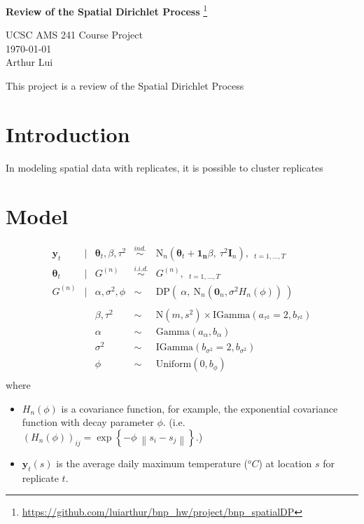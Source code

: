 \documentclass{article}
\def\wl{\par \vspace{\baselineskip}\noindent}
\def\hline{ \textcolor{lgrey}{\hrulefill} }
\newcommand{\m}[1]{\mathbf{\bm{#1}}} %
\def\norm#1{\left\lVert#1\right\rVert}
\begin{document}
\begin{center}
  {\huge \textbf{Review of the Spatial Dirichlet Process}
    \footnote{\url{https://github.com/luiarthur/bnp_hw/project/bnp_spatialDP}}
  }\\
  \wl
  UCSC AMS 241 Course Project\\
  \noindent\today\\
  Arthur Lui\\
  \hline
\end{center}

This project is a review of the Spatial Dirichlet Process 

\section{Introduction}
In modeling spatial data with replicates, it is possible to cluster replicates

\section{Model}
\[
  \begin{array}{rclcl}
    \m y_t &|& \m\theta_t,\beta,\tau^2 &\overset{ind.}{\sim}&\text{N}_n(\m\theta_t+ \m{1_n}\beta,
    ~\tau^2\m I_n), ~~_{t=1,...,T}\\
    \m\theta_t &|& G^{(n)} &\overset{i.i.d.}{\sim}& G^{(n)}, ~~_{t=1,...,T} \\
    G^{(n)} &|& \alpha, \sigma^2, \phi &\sim& \text{DP}(~\alpha,~\text{N}_n(\m 0_n,\sigma^2H_n(\phi)) ~) \\
    \\
            && \beta, \tau^2 &\sim& \text{N}(m,s^2) \times \text{IGamma}(a_{\tau^2}=2,b_{\tau^2}) \\
            && \alpha &\sim& \text{Gamma}(a_\alpha,b_\alpha) \\
            && \sigma^2 &\sim& \text{IGamma}(b_{\sigma^2}=2,b_{\sigma^2}) \\
            && \phi &\sim& \text{Uniform}(0,b_\phi) \\
  \end{array}
\]
where 
\begin{itemize}
  \item $H_n(\phi)$ is a covariance function, for example, the exponential
    covariance function with decay parameter $\phi$. (i.e.  $(H_n(\phi))_{ij}
    = \exp\left\{-\phi~\norm{s_i-s_j}\right\}$.) \\
  \item $\m y_t(s)$ is the average daily maximum temperature ($^oC$) at location $s$ for replicate $t$.
\end{itemize}
\end{document}
